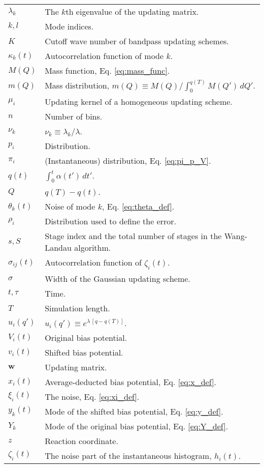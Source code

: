 \documentclass[reprint, superscriptaddress, floatfix]{revtex4-1}
\begin{document}
{\begin{table*}
\begin{tabular}{l | p{12cm} }
    $\lambda_k$     &   The $k$th eigenvalue of the updating matrix. \\
    $k, l$          &   Mode indices. \\
    $K$             &   Cutoff wave number of bandpass updating schemes.  \\
    $\kappa_k(t)$   &   Autocorrelation function of mode $k$. \\
    $M(Q)$          &   Mass function, Eq. \eqref{eq:mass_func}.   \\
    $m(Q)$          &   Mass distribution,
                        $m(Q) \equiv M(Q)/\int_0^{ q(T) } M(Q') \, dQ'$.  \\
    $\mu_i$         &   Updating kernel of a homogeneous updating scheme. \\
    $n$             &   Number of bins. \\
    $\nu_k$         &   $\nu_k \equiv \lambda_k / \lambda$. \\
    $p_i$           &   Distribution. \\
    $\pi_i$         &   (Instantaneous) distribution, Eq. \eqref{eq:pi_p_V}. \\
    $q(t)$          &   $\int_0^t \alpha(t') \, dt'$.  \\
    $Q$             &   $q(T) - q(t)$.  \\
    $\theta_k(t)$   &   Noise of mode $k$, Eq. \eqref{eq:theta_def}. \\
    $\rho_i$        &   Distribution used to define the error. \\
    $s, S$          &   Stage index and the total number of stages in the Wang-Landau algorithm. \\
    $\sigma_{ij}(t)$   &   Autocorrelation function of $\zeta_i(t)$. \\
    $\sigma$        &   Width of the Gaussian updating scheme. \\
    $t, \tau$       &   Time. \\
    $T$             &   Simulation length. \\
    $u_i(q')$       &   $u_i(q') \equiv e^{\lambda \, [q - q(T)]}$. \\
    $V_i(t)$        &   Original bias potential. \\
    $v_i(t)$        &   Shifted bias potential. \\
    $\mathbf w$     &   Updating matrix. \\
    $x_i(t)$        &   Average-deducted bias potential, Eq. \eqref{eq:x_def}. \\
    $\xi_i(t)$      &   The noise, Eq. \eqref{eq:xi_def}. \\
    $y_k(t)$        &   Mode of the shifted bias potential, Eq. \eqref{eq:y_def}. \\
    $Y_k$           &   Mode of the original bias potential, Eq. \eqref{eq:Y_def}. \\
    $z$             &   Reaction coordinate. \\
    $\zeta_i(t)$    &   The noise part of the instantaneous histogram, $h_i(t)$.
  \end{tabular}
  \end{table*}
}


\end{document}
